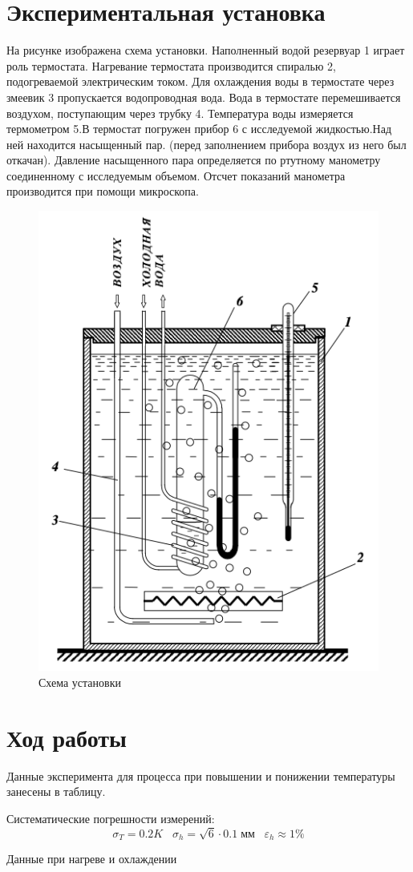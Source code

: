 \documentclass[12pt,a4paper]{article}
\begin{document}
	
	\section*{Экспериментальная установка}
	
	На рисунке изображена схема установки.  Наполненный водой резервуар 1 играет роль термостата. Нагревание термостата производится спиралью 2, подогреваемой электрическим током. Для охлаждения воды в термостате через змеевик 3 пропускается водопроводная вода. Вода в термостате перемешивается воздухом, поступающим через трубку 4. Температура воды измеряется термометром 5.В термостат погружен прибор 6 с исследуемой жидкостью.Над ней находится насыщенный пар. (перед заполнением прибора воздух из него был откачан). Давление насыщенного пара определяется по ртутному манометру соединенному с исследуемым объемом. Отсчет показаний манометра производится при помощи микроскопа.\\
	
	\begin{figure}[h]
		\begin{center}
			\includegraphics[width=0.3\linewidth]{scheme1.jpg}
		\end{center}
		\caption{Схема установки}
		\label{img2}
	\end{figure}	
	
	
	\section*{Ход работы}
	
	Данные эксперимента для процесса при повышении и понижении температуры занесены в таблицу.
	
	Систематические погрешности измерений: $$ \sigma_T = 0.2 K \;\;\; \sigma_h = \sqrt{6} \cdot 0.1 \; \text{мм}\;\;\; \varepsilon_h \approx 1 \%$$
	
	\begin{table}[H]
		
		\hspace{0.1\textwidth}
		
		
		\caption{Данные при нагреве и охлаждении}		
	\end{table}
\end{document}

